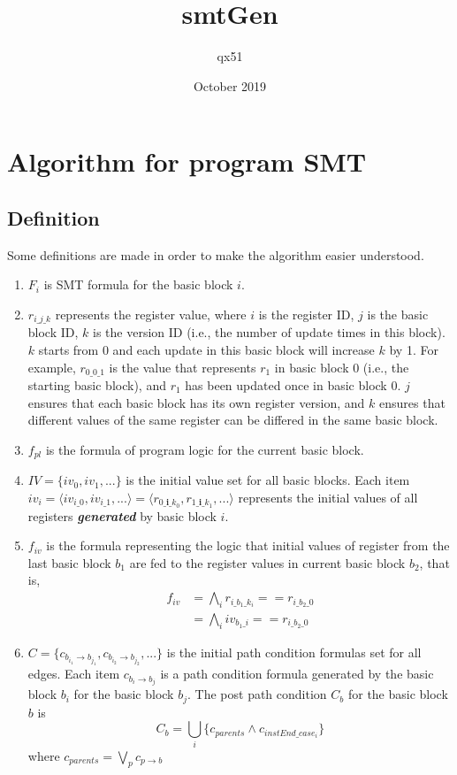 \documentclass{article}
\title{smtGen}
\author{qx51 }
\date{October 2019}
\begin{document}
\section{Algorithm for program SMT}
\subsection{Definition}

Some definitions are made in order to make the algorithm easier understood.
\begin{enumerate}
\item $F_{i}$ is SMT formula for the basic block $i$.
\item $r_{i\_j\_k}$ represents the register value, where $i$ is the register ID, $j$ is the basic block ID, $k$ is the version ID (i.e., the number of update times in this block). $k$ starts from $0$ and each update in this basic block will increase $k$ by 1. For example, $r_{0\_0\_1}$ is the value that represents $r_1$ in basic block 0 (i.e., the starting basic block), and $r_1$ has been updated once in basic block 0. $j$ ensures that each basic block has its own register version, and $k$ ensures that different values of the same register can be differed in the same basic block.
\item $f_{pl}$ is the formula of program logic for the current basic block.
\item $IV = \{iv_0, iv_1, ... \}$ is the initial value set for all basic blocks. Each item $iv_i = \langle iv_{i\_0}, iv_{i\_1}, ... \rangle = \langle r_{0\_\bm{i}\_k_0}, r_{1\_\bm{i}\_k_1}, ...\rangle$ represents the initial values of all registers \textbf{\textit{generated}} by basic block $i$.

\item $f_{iv}$ is the formula representing the logic that initial values of register from the last basic block $b_1$ are fed to the register values in current basic block $b_2$, that is,
\begin{equation}
\begin{aligned}
f_{iv} &= \bigwedge_{i} r_{i\_b_1\_k_i} == r_{i\_b_2\_0} \\
&= \bigwedge_{i} iv_{b_1\_i} == r_{i\_b_2\_0}
\end{aligned}
\end{equation}
\item $C = \{c_{b_{i_1}\rightarrow b_{j_1}}, c_{b_{i_2}\rightarrow b_{j_2}}, ...\}$ is the initial path condition formulas set for all edges. Each item $c_{b_i\rightarrow b_j}$ is a path condition formula generated by the basic block $b_i$ for the basic block $b_j$. 
The post path condition $C_b$ for the basic block $b$ is
\begin{equation}
C_b = \bigcup_i \{c_{parents}\wedge c_{instEnd\_case_i}\}
\end{equation}
where $c_{parents} = \bigvee_{p} c_{p\rightarrow b}$
\end{enumerate}
\end{document}
